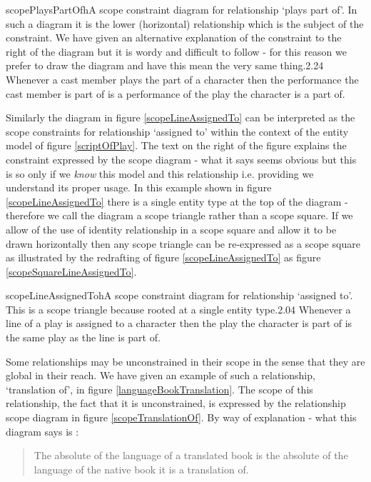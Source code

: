 \documentclass[10pt,a4paper]{article}
\begin{document}
\begin{ernotedDimFig}{scopePlaysPartOf}{h}{A scope constraint diagram for relationship `plays part of'. In such a diagram it is the lower (horizontal) relationship which is the subject of the constraint. 
We have given an alternative explanation of the constraint to the right of the diagram but it is wordy and difficult to follow - for this reason we prefer to draw the diagram and have this mean the very same thing.}{2.2}{4}
Whenever a cast member plays the part of a character then the performance the cast member is part of is a performance of the play the character is a part of.
\end{ernotedDimFig} 


\noindent Similarly the diagram in figure \ref{scopeLineAssignedTo}  can be interpreted as the scope constraints for relationship `assigned to' within the context of the entity model of figure \ref{scriptOfPlay}. The text on the right of the figure explains the constraint expressed by the scope diagram - what it says seems obvious but this is so only if we \emph{know} this model and this relationship i.e. providing we understand its proper usage. In this example shown in figure \ref{scopeLineAssignedTo} there is a single entity type at the top of the diagram - therefore we call the diagram a scope triangle rather than a scope square. \noindent If we allow of the use of identity relationship in a scope square and allow it to be drawn horizontally then any scope triangle can be re-expressed as a scope square as illustrated by the redrafting of figure \ref{scopeLineAssignedTo} as figure \ref{scopeSquareLineAssignedTo}. \\

\begin{ernotedDimFig}{scopeLineAssignedTo}{h}{A scope constraint diagram for relationship `assigned to'. This is a scope triangle because rooted at a single entity type.}{2.0}{4}
Whenever a line of a play is assigned to a character then the play the character is part of is the same play as the line is part of.
\end{ernotedDimFig} 


\noindent Some relationships may be unconstrained in their scope in the sense that they are global in their reach. We have given an example of such a relationship, `translation of', in figure \ref{languageBookTranslation}. The scope of this relationship, the fact that it is unconstrained, is expressed by the relationship scope diagram in figure 
\ref{scopeTranslationOf}. 
By way of explanation - what this diagram says is :
\begin {quote}
The absolute of the language of a translated book is the absolute of the language of the native book it is a translation of.
\end{quote} 
\end{document}

